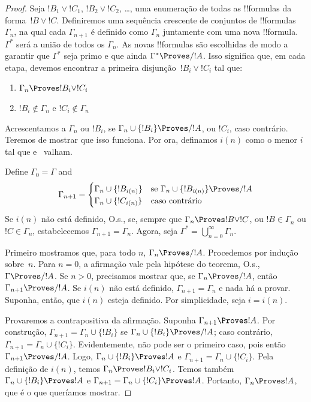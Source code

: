 \documentclass[../../../include/open-logic-section]{subfiles}
\begin{document}
\begin{proof}
  Seja $!B_1 \lor !C_1$, $!B_2 \lor !C_2$, \dots, uma enumeração de
  todas as !!{formula}s da forma~$!B \lor !C$. Definiremos uma
  sequência crescente de conjuntos de !!{formula}s~$\Gamma_n$, na
  qual cada $\Gamma_{n+1}$ é definido como $\Gamma_n$ juntamente com
  uma nova !!{formula}. $\Gamma^*$ será a união de todos os
  $\Gamma_n$. As novas !!{formula}s são escolhidas de modo a garantir
  que $\Gamma^*$ seja primo e que ainda $\Gamma^* \Proves/ !A$. Isso
  significa que, em cada etapa, devemos encontrar a primeira
  disjunção~$!B_i \lor !C_i$ tal que:
  \begin{enumerate}
  \item{} $\Gamma_n \Proves !B_i \lor !C_i$
  \item{} $!B_i \notin \Gamma_n$ e $!C_i \notin \Gamma_n$
  \end{enumerate}
  Acrescentamos a $\Gamma_n$ ou $!B_i$, se
  $\Gamma_n \cup \{!B_i\} \Proves/ !A$, ou $!C_i$, caso contrário.
  Teremos de mostrar que isso funciona. Por ora, definamos $i(n)$ como
  o menor $i$ tal que  e~ valham.
  
  Define $\Gamma_0 = \Gamma$ and
  \[
  \Gamma_{n+1} = \begin{cases}
    \Gamma_n \cup \{!B_{i(n)}\} &
    \text{se $\Gamma_n \cup \{!B_{i(n)}\} \Proves/ !A$} \\
    \Gamma_n \cup \{!C_{i(n)}\} & \text{caso contrário}
    \end{cases}
  \]
  Se $i(n)$ não está definido, O.s.\@, se, sempre que
  $\Gamma_n \Proves !B \lor !C$, ou $!B \in \Gamma_n$ ou
  $!C \in \Gamma_n$, estabelecemos $\Gamma_{n+1} = \Gamma_n$.
  Agora, seja $\Gamma^* = \bigcup_{n=0}^\infty \Gamma_n$.

  Primeiro mostramos que, para todo $n$, $\Gamma_n \Proves/ !A$.
  Procedemos por indução sobre~$n$. Para $n = 0$, a afirmação vale pela
  hipótese do teorema, O.s.\@, $\Gamma \Proves/ !A$. Se $n>0$,
  precisamos mostrar que, se $\Gamma_n \Proves/ !A$, então
  $\Gamma_{n+1} \Proves/ !A$. Se $i(n)$ não está definido,
  $\Gamma_{n+1} = \Gamma_n$ e nada há a provar. Suponha, então, que
  $i(n)$ esteja definido. Por simplicidade, seja $i = i(n)$.
  
  Provaremos a contrapositiva da afirmação. Suponha
  $\Gamma_{n+1} \Proves !A$. Por construção,
  $\Gamma_{n+1} = \Gamma_n \cup \{!B_i\}$ se
  $\Gamma_n \cup \{!B_i\} \Proves/ !A$; caso contrário,
  $\Gamma_{n+1} = \Gamma_n \cup \{!C_i\}$. Evidentemente, não pode ser
  o primeiro caso, pois então $\Gamma_{n+1} \Proves/ !A$. Logo,
  $\Gamma_n \cup \{!B_i\} \Proves !A$ e
  $\Gamma_{n+1} = \Gamma_n \cup \{!C_i\}$. Pela definição de $i(n)$,
  temos $\Gamma _n \Proves !B_i \lor !C_i$. Temos também
  $\Gamma_n \cup \{!B_i\} \Proves !A$ e
  $\Gamma_{n+1} = \Gamma_n \cup \{!C_i\} \Proves !A$. Portanto,
  $\Gamma_n \Proves !A$, que é o que queríamos mostrar.


\end{proof}
\end{document}
